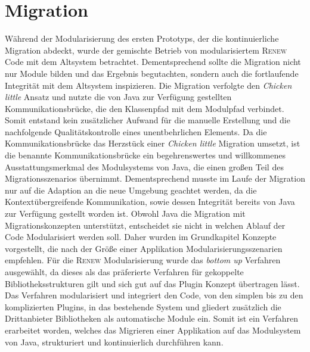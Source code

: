 \section{Migration}
Während der Modularisierung des ersten Prototyps, der die kontinuierliche Migration abdeckt, wurde der gemischte Betrieb von modularisiertem \textsc{Renew} Code mit dem Altsystem betrachtet. Dementsprechend sollte die Migration nicht nur Module bilden und das Ergebnis begutachten, sondern auch die fortlaufende Integrität mit dem Altsystem inspizieren.\newline
Die Migration verfolgte den \textit{Chicken little} Ansatz und nutzte die von Java zur Verfügung gestellten Kommunikationsbrücke, die den Klassenpfad mit dem Modulpfad verbindet. Somit entstand kein zusätzlicher Aufwand für die manuelle Erstellung und die nachfolgende Qualitätskontrolle eines unentbehrlichen Elements. Da die Kommunikationsbrücke das Herzstück einer \textit{Chicken little} Migration umsetzt, ist die benannte Kommunikationsbrücke ein begehrenswertes und willkommenes Ausstattungsmerkmal des Modulsystems von Java, die einen großen Teil des Migrationsszenarios übernimmt. Dementsprechend musste im Laufe der Migration nur auf die Adaption an die neue Umgebung geachtet werden, da die Kontextübergreifende Kommunikation, sowie dessen Integrität bereits von Java zur Verfügung gestellt worden ist. \newline
Obwohl Java die Migration mit Migrationskonzepten unterstützt, entscheidet sie nicht in welchen Ablauf der Code Modularisiert werden soll. Daher wurden im Grundkapitel Konzepte vorgestellt, die nach der Größe einer Applikation Modularisierungsszenarien empfehlen. Für die \textsc{Renew} Modularisierung wurde das \textit{bottom up} Verfahren ausgewählt, da dieses als das präferierte Verfahren für gekoppelte Bibliotheksstrukturen gilt und sich gut auf das Plugin Konzept übertragen lässt. Das Verfahren modularisiert und integriert den Code, von den simplen bis zu den komplizierten Plugins, in das bestehende System und gliedert zusätzlich die Drittanbieter Bibliotheken als automatische Module ein.\newline
Somit ist ein Verfahren erarbeitet worden, welches das Migrieren einer Applikation auf das Modulsystem von Java, strukturiert und kontinuierlich durchführen kann.

